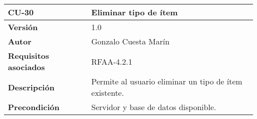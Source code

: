 \begin{longtable}[]{@{}ll@{}}
\toprule
\begin{minipage}[b]{0.23\columnwidth}\raggedright
\textbf{CU-30}\strut
\end{minipage} & \begin{minipage}[b]{0.71\columnwidth}\raggedright
\textbf{Eliminar tipo de ítem}\strut
\end{minipage}\tabularnewline
\midrule
\endhead
\begin{minipage}[t]{0.23\columnwidth}\raggedright
\textbf{Versión}\strut
\end{minipage} & \begin{minipage}[t]{0.71\columnwidth}\raggedright
1.0\strut
\end{minipage}\tabularnewline
\begin{minipage}[t]{0.23\columnwidth}\raggedright
\textbf{Autor}\strut
\end{minipage} & \begin{minipage}[t]{0.71\columnwidth}\raggedright
Gonzalo Cuesta Marín\strut
\end{minipage}\tabularnewline
\begin{minipage}[t]{0.23\columnwidth}\raggedright
\textbf{Requisitos asociados}\strut
\end{minipage} & \begin{minipage}[t]{0.71\columnwidth}\raggedright
RFAA-4.2.1\strut
\end{minipage}\tabularnewline
\begin{minipage}[t]{0.23\columnwidth}\raggedright
\textbf{Descripción}\strut
\end{minipage} & \begin{minipage}[t]{0.71\columnwidth}\raggedright
Permite al usuario eliminar un tipo de ítem existente.\strut
\end{minipage}\tabularnewline
\begin{minipage}[t]{0.23\columnwidth}\raggedright
\textbf{Precondición}\strut
\end{minipage} & \begin{minipage}[t]{0.71\columnwidth}\raggedright
Servidor y base de datos disponible.


\end{minipage}
\end{longtable}
